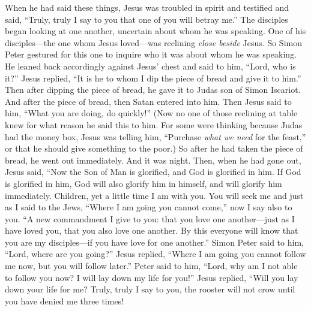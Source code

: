 \begin{biblechapter}
 When he had said these things, Jesus was troubled in spirit and testified and said, “Truly, truly I say to you that one of you will betray me.”
\verse The disciples began looking at one another, uncertain about whom he was speaking.
\verse One of his disciples—the one whom Jesus loved—was reclining \textit{close beside} Jesus.
\verse So Simon Peter gestured for this one to inquire who it was about whom he was speaking.
\verse He leaned back accordingly against Jesus’ chest and said to him, “Lord, who is it?”
\verse Jesus replied, “It is he to whom I dip the piece of bread and give it to him.” Then after dipping the piece of bread, he gave it﻿ to Judas son of Simon Iscariot.
\verse And after the piece of bread, then Satan entered into him. Then Jesus said to him, “What you are doing, do quickly!”
\verse (Now no one of those reclining at table knew for what reason he said this to him.
\verse For some were thinking because Judas had the money box, Jesus was telling him, “Purchase \textit{what we need} for the feast,” or that he should give something to the poor.)
\verse So after he had taken the piece of bread, he went out immediately. And it was night.
 Then, when he had gone out, Jesus said, “Now the Son of Man is glorified, and God is glorified in him.
\verse If God is glorified in him, God will also glorify him in himself, and will glorify him immediately.
\verse Children, yet a little time I am with you. You will seek me and just as I said to the Jews, “Where I am going you cannot come,” now I say also to you.
\verse “A new commandment I give to you: that you love one another—just as I have loved you, that you also love one another.
\verse By this everyone will know that you are my disciples—if you have love for one another.”
\verse Simon Peter said to him, “Lord, where are you going?” Jesus replied, “Where I am going you cannot follow me now, but you will follow later.”
\verse Peter said to him, “Lord, why am I not able to follow you now? I will lay down my life for you!”
\verse Jesus replied, “Will you lay down your life for me? Truly, truly I say to you, the rooster will not crow until you have denied me three times!
\end{biblechapter}

